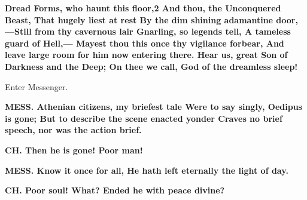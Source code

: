 \documentclass[11pt,letter]{book}
\begin{document}
\par \textbf{Dread Forms, who haunt this floor,2 And thou, the Unconquered Beast, That hugely liest at rest By the dim shining adamantine door, —Still from thy cavernous lair Gnarling, so legends tell, A tameless guard of Hell,— Mayest thou this once thy vigilance forbear, And leave large room for him now entering there. Hear us, great Son of Darkness and the Deep; On thee we call, God of the dreamless sleep!}
\par 

\par  Enter Messenger.

\par \textbf{MESS. Athenian citizens, my briefest tale Were to say singly, Oedipus is gone; But to describe the scene enacted yonder Craves no brief speech, nor was the action brief.}
\par 

\par \textbf{CH. Then he is gone! Poor man!}
\par 

\par \textbf{MESS. Know it once for all, He hath left eternally the light of day.}
\par 

\par \textbf{CH. Poor soul! What? Ended he with peace divine?}
\par 
\end{document}
